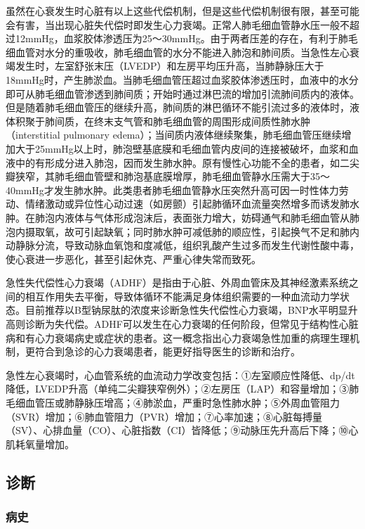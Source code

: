 虽然在心衰发生时心脏有以上这些代偿机制，但是这些代偿机制很有限，甚至可能会有害，当出现心脏失代偿时即发生心力衰竭。正常人肺毛细血管静水压一般不超过12mmHg，血浆胶体渗透压为25～30mmHg。由于两者压差的存在，有利于肺毛细血管对水分的重吸收，肺毛细血管的水分不能进入肺泡和肺间质。当急性左心衰竭发生时，左室舒张末压（LVEDP）和左房平均压升高，当肺静脉压大于18mmHg时，产生肺淤血。当肺毛细血管压超过血浆胶体渗透压时，血液中的水分即可从肺毛细血管渗透到肺间质；开始时通过淋巴流的增加引流肺间质内的液体。但是随着肺毛细血管压的继续升高，肺间质的淋巴循环不能引流过多的液体时，液体积聚于肺间质，在终末支气管和肺毛细血管的周围形成间质性肺水肿（interstitial
pulmonary
edema）；当间质内液体继续聚集，肺毛细血管压继续增加大于25mmHg以上时，肺泡壁基底膜和毛细血管内皮间的连接被破坏，血浆和血液中的有形成分进入肺泡，因而发生肺水肿。原有慢性心功能不全的患者，如二尖瓣狭窄，其肺毛细血管壁和肺泡基底膜增厚，肺毛细血管静水压需大于35～40mmHg才发生肺水肿。此类患者肺毛细血管静水压突然升高可因一时性体力劳动、情绪激动或异位性心动过速（如房颤）引起肺循环血流量突然增多而诱发肺水肿。在肺泡内液体与气体形成泡沫后，表面张力增大，妨碍通气和肺毛细血管从肺泡内摄取氧，故可引起缺氧；同时肺水肿可减低肺的顺应性，引起换气不足和肺内动静脉分流，导致动脉血氧饱和度减低，组织乳酸产生过多而发生代谢性酸中毒，使心衰进一步恶化，甚至引起休克、严重心律失常而致死。

急性失代偿性心力衰竭（ADHF）是指由于心脏、外周血管床及其神经激素系统之间的相互作用失去平衡，导致体循环不能满足身体组织需要的一种血流动力学状态。目前推荐以B型钠尿肽的浓度来诊断急性失代偿性心力衰竭，BNP水平明显升高则诊断为失代偿。ADHF可以发生在心力衰竭的任何阶段，但常见于结构性心脏病和有心力衰竭病史或症状的患者。这一概念指出心力衰竭急性加重的病理生理机制，更符合到急诊的心力衰竭患者，能更好指导医生的诊断和治疗。

急性左心衰竭时，心血管系统的血流动力学改变包括：①左室顺应性降低、dp/dt降低，LVEDP升高（单纯二尖瓣狭窄例外）；②左房压（LAP）和容量增加；③肺毛细血管压或肺静脉压增高；④肺淤血，严重时急性肺水肿；⑤外周血管阻力（SVR）增加；⑥肺血管阻力（PVR）增加；⑦心率加速；⑧心脏每搏量（SV）、心排血量（CO）、心脏指数（CI）皆降低；⑨动脉压先升高后下降；⑩心肌耗氧量增加。

\subsection{诊断}

\subsubsection{病史}

